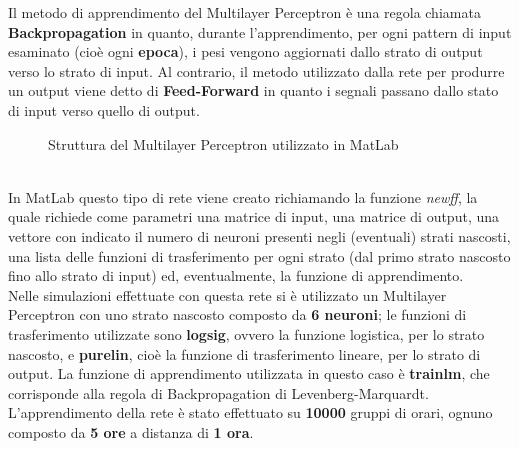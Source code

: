 		Il metodo di apprendimento del Multilayer Perceptron è una regola chiamata \textbf{Backpropagation} in quanto, durante l'apprendimento, per ogni pattern di input esaminato (cioè ogni \textbf{epoca}), i pesi vengono aggiornati dallo strato di output verso lo strato di input. Al contrario, il metodo utilizzato dalla rete per produrre un output viene detto di \textbf{Feed-Forward} in quanto i segnali passano dallo stato di input verso quello di output.\\
		\begin{figure}[h]
			\begin{center}
				\setlength\fboxsep{0pt}
				\setlength\fboxrule{2pt}
			\end{center}
			\caption{Struttura del Multilayer Perceptron utilizzato in MatLab}
		\end{figure}\\
		In MatLab questo tipo di rete viene creato richiamando la funzione \textit{newff}, la quale richiede come parametri una matrice di input, una matrice di output, una vettore con indicato il numero di neuroni presenti negli (eventuali) strati nascosti, una lista delle funzioni di trasferimento per ogni strato (dal primo strato nascosto fino allo strato di input) ed, eventualmente, la funzione di apprendimento.\\
		Nelle simulazioni effettuate con questa rete si è utilizzato un Multilayer Perceptron con uno strato nascosto composto da \textbf{6 neuroni}; le funzioni di trasferimento utilizzate sono \textbf{logsig}, ovvero la funzione logistica, per lo strato nascosto, e \textbf{purelin}, cioè la funzione di trasferimento lineare, per lo strato di output. La funzione di apprendimento utilizzata in questo caso è \textbf{trainlm}, che corrisponde alla regola di Backpropagation di Levenberg-Marquardt.\\
		L'apprendimento della rete è stato effettuato su \textbf{10000} gruppi di orari, ognuno composto da \textbf{5 ore} a distanza di \textbf{1 ora}.